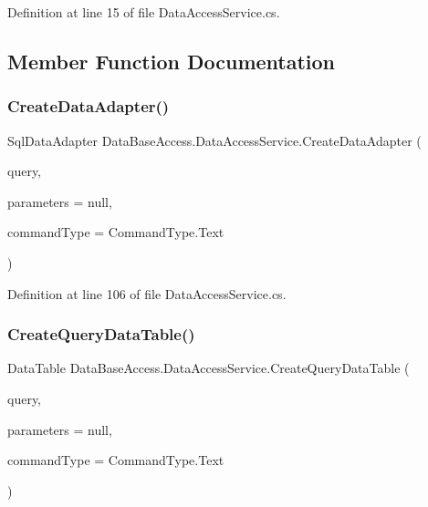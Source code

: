 Definition at line 15 of file Data\+Access\+Service.\+cs.



\subsection{Member Function Documentation}
\mbox{\label{classDataBaseAccess_1_1DataAccessService_ae6a0580081ad0f43553d20a4a9b8507f}} 
\subsubsection{\texorpdfstring{CreateDataAdapter()}{CreateDataAdapter()}}
{\footnotesize\ttfamily Sql\+Data\+Adapter Data\+Base\+Access.\+Data\+Access\+Service.\+Create\+Data\+Adapter (\begin{DoxyParamCaption}\item[{string}]{query,  }\item[{Dictionary$<$ string, object $>$}]{parameters = {\ttfamily null},  }\item[{Command\+Type}]{command\+Type = {\ttfamily CommandType.Text} }\end{DoxyParamCaption})}



Definition at line 106 of file Data\+Access\+Service.\+cs.

\mbox{\label{classDataBaseAccess_1_1DataAccessService_a587d762011b75b6b184ba56007fd9495}} 
\subsubsection{\texorpdfstring{CreateQueryDataTable()}{CreateQueryDataTable()}}
{\footnotesize\ttfamily Data\+Table Data\+Base\+Access.\+Data\+Access\+Service.\+Create\+Query\+Data\+Table (\begin{DoxyParamCaption}\item[{string}]{query,  }\item[{Dictionary$<$ string, object $>$}]{parameters = {\ttfamily null},  }\item[{Command\+Type}]{command\+Type = {\ttfamily CommandType.Text} }\end{DoxyParamCaption})}



